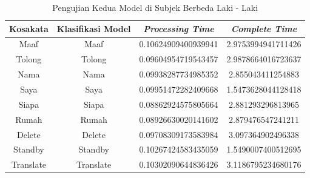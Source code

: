 \begin{longtable}{|c|c|c|c|}
  \caption{Pengujian Kedua Model di Subjek Berbeda Laki - Laki}
  \label{tb:prediksilaki2}                                   \\
  \hline
  \rowcolor[HTML]{C0C0C0}
  \textbf{Kosakata} & \textbf{Klasifikasi Model} & \textbf{\emph{Processing Time}} & \textbf{\emph{Complete Time}}\\
  \hline
  Maaf              & Maaf                        & 0.10624909400939941                           & 2.9753994941711426                                  \\
  Tolong            & Tolong                        & 0.09604954719543457                           & 2.9878664016723637                                  \\
  Nama              & Nama                        & 0.09938287734985352                           & 2.855043411254883                                  \\
  Saya              & Saya                        & 0.09951472282409668                           & 1.5473628044128418                                  \\
  Siapa              & Siapa                        & 0.08862924575805664                           & 2.881293296813965                                  \\
  Rumah             & Rumah                        & 0.08926630020141602                           & 2.879476547241211                                  \\
  Delete            & Delete                        & 0.09708309173583984                           & 3.097364902496338                                  \\
  Standby           & Standby                        & 0.10267424583435059                           & 1.5490007400512695                                  \\
  Translate         & Translate                        & 0.10302090644836426                           & 3.1186795234680176                                  \\
  \hline
\end{longtable}

